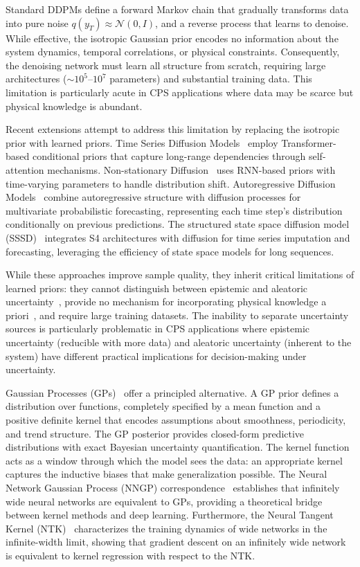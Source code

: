 \documentclass[conference]{IEEEtran}
\begin{document}
Standard DDPMs define a forward Markov chain that gradually transforms data into pure noise $q(y_T) \approx \mathcal{N}(0, I)$, and a reverse process that learns to denoise. While effective, the isotropic Gaussian prior encodes no information about the system dynamics, temporal correlations, or physical constraints. Consequently, the denoising network must learn all structure from scratch, requiring large architectures ($\sim 10^5$--$10^7$ parameters) and substantial training data. This limitation is particularly acute in CPS applications where data may be scarce but physical knowledge is abundant.

Recent extensions attempt to address this limitation by replacing the isotropic prior with learned priors. Time Series Diffusion Models~\cite{TMDM} employ Transformer-based conditional priors that capture long-range dependencies through self-attention mechanisms. Non-stationary Diffusion~\cite{NSDiff} uses RNN-based priors with time-varying parameters to handle distribution shift. Autoregressive Diffusion Models~\cite{ARMD} combine autoregressive structure with diffusion processes for multivariate probabilistic forecasting, representing each time step's distribution conditionally on previous predictions. The structured state space diffusion model (SSSD)~\cite{Alcaraz2022SSSD} integrates S4 architectures with diffusion for time series imputation and forecasting, leveraging the efficiency of state space models for long sequences.

While these approaches improve sample quality, they inherit critical limitations of learned priors: they cannot distinguish between epistemic and aleatoric uncertainty~\cite{Kendall2017}, provide no mechanism for incorporating physical knowledge a priori~\cite{Su2025Survey}, and require large training datasets. The inability to separate uncertainty sources is particularly problematic in CPS applications where epistemic uncertainty (reducible with more data) and aleatoric uncertainty (inherent to the system) have different practical implications for decision-making under uncertainty.

Gaussian Processes (GPs)~\cite{Rasmussen2006GP} offer a principled alternative. A GP prior defines a distribution over functions, completely specified by a mean function and a positive definite kernel that encodes assumptions about smoothness, periodicity, and trend structure. The GP posterior provides closed-form predictive distributions with exact Bayesian uncertainty quantification. The kernel function acts as a window through which the model sees the data: an appropriate kernel captures the inductive biases that make generalization possible. The Neural Network Gaussian Process (NNGP) correspondence~\cite{Neal1996Priors, Lee2018NNGP} establishes that infinitely wide neural networks are equivalent to GPs, providing a theoretical bridge between kernel methods and deep learning. Furthermore, the Neural Tangent Kernel (NTK)~\cite{Jacot2018NTK} characterizes the training dynamics of wide networks in the infinite-width limit, showing that gradient descent on an infinitely wide network is equivalent to kernel regression with respect to the NTK.
\end{document}
